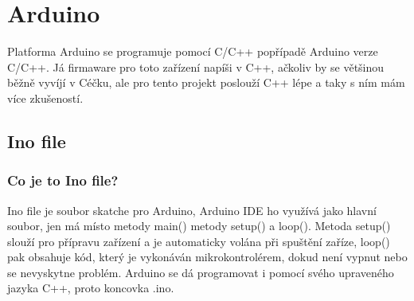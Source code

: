 
\section{Arduino}
Platforma Arduino se programuje pomocí C/C++ popřípadě Arduino verze C/C++. Já firmaware pro toto zařízení napíši v C++, ačkoliv by se většinou běžně vyvíjí v Céčku, ale pro tento projekt poslouží C++ lépe a taky s ním mám více zkušeností.

\subsection{Ino file}


\subsubsection*{Co je to Ino file?}
Ino file je soubor skatche pro Arduino, Arduino IDE ho využívá jako hlavní soubor, jen má místo metody main() metody setup() a loop().  Metoda setup() slouží pro přípravu zařízení a je automaticky volána při spuštění zaříze,  loop() pak obsahuje kód, který je vykonáván mikrokontrolérem, dokud není vypnut nebo se nevyskytne problém. Arduino se dá programovat i pomocí svého upraveného jazyka C++, proto koncovka .ino.



